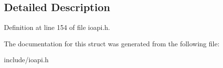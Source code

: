 \subsection{Detailed Description}


Definition at line 154 of file ioapi.\-h.



The documentation for this struct was generated from the following file\-:\begin{DoxyCompactItemize}
\item 
include/ioapi.\-h\end{DoxyCompactItemize}
